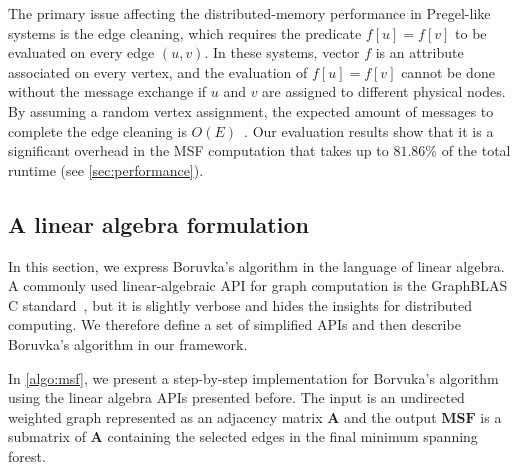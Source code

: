 \documentclass{sokendai_thesis} %
\newcommand{\boruvka}[0]{Boruvka}
\begin{document}
The primary issue affecting the distributed-memory performance in Pregel-like systems is the edge cleaning, which requires the predicate $f[u]=f[v]$ to be evaluated on every edge $(u, v)$.
In these systems, vector $f$ is an attribute associated on every vertex, and the evaluation of $f[u]=f[v]$ cannot be done without the message exchange if $u$ and $v$ are assigned to different physical nodes.
By assuming a random vertex assignment, the expected amount of messages to complete the edge cleaning is $O(E)$~\cite{bourse2014balanced}.
Our evaluation results show that it is a significant overhead in the MSF computation that takes up to $81.86\%$ of the total runtime (see \autoref{sec:performance}).

\subsection{A linear algebra formulation}
\label{sec:algorithm}

In this section, we express \boruvka{}'s algorithm in the language of linear algebra.
A commonly used linear-algebraic API for graph computation is the GraphBLAS C standard~\cite{graphblas}, but it is slightly verbose and hides the insights for distributed computing.
We therefore define a set of simplified APIs and then describe \boruvka{}'s algorithm in our framework.


In \autoref{algo:msf}, we present a step-by-step implementation for Borvuka's algorithm using the linear algebra APIs presented before.
The input is an undirected weighted graph represented as an adjacency matrix $\mathbf{A}$ and the output $\mathbf{MSF}$ is a submatrix of $\mathbf{A}$ containing the selected edges in the final minimum spanning forest.
\end{document}
